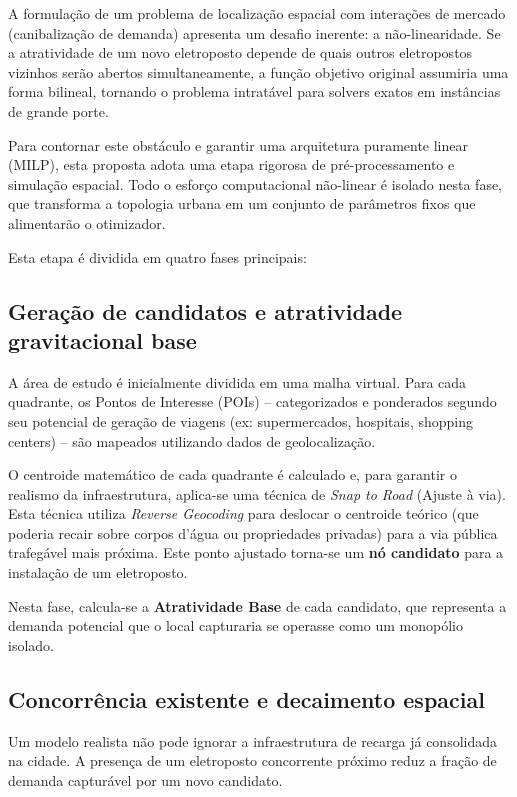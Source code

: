 A formulação de um problema de localização espacial com interações de mercado (canibalização de demanda) apresenta um desafio inerente: a não-linearidade. Se a atratividade de um novo eletroposto depende de quais outros eletropostos vizinhos serão abertos simultaneamente, a função objetivo original assumiria uma forma bilineal, tornando o problema intratável para solvers exatos em instâncias de grande porte.

Para contornar este obstáculo e garantir uma arquitetura puramente linear (MILP), esta proposta adota uma etapa rigorosa de pré-processamento e simulação espacial. Todo o esforço computacional não-linear é isolado nesta fase, que transforma a topologia urbana em um conjunto de parâmetros fixos que alimentarão o otimizador.

Esta etapa é dividida em quatro fases principais:

\subsection{Geração de candidatos e atratividade gravitacional base}

A área de estudo é inicialmente dividida em uma malha virtual. Para cada quadrante, os Pontos de Interesse (POIs) -- categorizados e ponderados segundo seu potencial de geração de viagens (ex: supermercados, hospitais, shopping centers) -- são mapeados utilizando dados de geolocalização.

O centroide matemático de cada quadrante é calculado e, para garantir o realismo da infraestrutura, aplica-se uma técnica de \textit{Snap to Road} (Ajuste à via). Esta técnica utiliza \textit{Reverse Geocoding} para deslocar o centroide teórico (que poderia recair sobre corpos d'água ou propriedades privadas) para a via pública trafegável mais próxima. Este ponto ajustado torna-se um \textbf{nó candidato} para a instalação de um eletroposto.

Nesta fase, calcula-se a \textbf{Atratividade Base} de cada candidato, que representa a demanda potencial que o local capturaria se operasse como um monopólio isolado.

\subsection{Concorrência existente e decaimento espacial}

Um modelo realista não pode ignorar a infraestrutura de recarga já consolidada na cidade. A presença de um eletroposto concorrente próximo reduz a fração de demanda capturável por um novo candidato.

